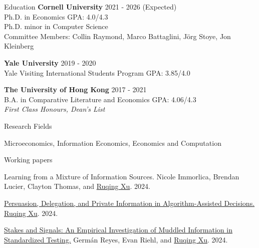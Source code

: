 \documentclass{resume} %
\begin{document}

\begin{rSection}{Education}
{\bf Cornell University} \hfill {2021 - 2026 (Expected)} 
\\ Ph.D. in Economics \hfill {GPA: 4.0/4.3} \\
Ph.D. minor in Computer Science \hfill 
\\ Committee Members: Collin Raymond, Marco Battaglini, J\"{o}rg Stoye, Jon Kleinberg\hfill

{\bf Yale University} \hfill {2019 - 2020} 
\\ Yale Visiting International Students Program \hfill {GPA: 3.85/4.0}

{\bf The University of Hong Kong} \hfill {2017 - 2021} 
\\ B.A. in Comparative Literature and Economics \hfill {GPA: 4.06/4.3}
\\ \emph{First Class Honours, Dean's List}

\end{rSection}

\begin{rSection}{Research Fields} \itemsep -10pt
\item Microeconomics, Information Economics, Economics and Computation
\end{rSection}

\begin{rSection}{Working papers}

Learning from a Mixture of Information Sources. Nicole Immorlica, Brendan Lucier, Clayton Thomas, and \underline{Ruqing Xu}. 2024.

\href{https://ruqing-xu.github.io/assets/pdf/delegation_xu.pdf}{Persuasion, Delegation, and Private Information in Algorithm-Assisted Decisions.} \underline{Ruqing Xu}. 2024.

\href{https://ruqing-xu.github.io/assets/pdf/rrx_stakes_june2024.pdf}{Stakes and Signals: An Empirical Investigation of Muddled
Information in Standardized Testing.} Germán Reyes, Evan Riehl, and \underline{Ruqing Xu}. 2024.



\end{rSection}
\end{document}
